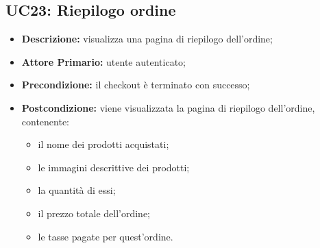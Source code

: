 \subsection{UC23: Riepilogo ordine}
\label{sec:UC23}
\begin{itemize}
    \item \textbf{Descrizione:} visualizza una pagina di riepilogo dell'ordine;
    \item \textbf{Attore Primario:} utente autenticato;
    \item \textbf{Precondizione:} il checkout è terminato con successo;
    \item \textbf{Postcondizione:} viene visualizzata la pagina di riepilogo dell'ordine, contenente:
          \begin{itemize}
              \item il nome dei prodotti acquistati;
              \item le immagini descrittive dei prodotti;
              \item la quantità di essi;
              \item il prezzo totale dell'ordine;
              \item le tasse pagate per quest'ordine.
          \end{itemize}
\end{itemize}
